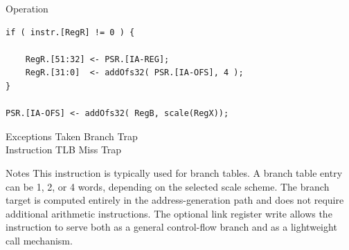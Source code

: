 \begin{iPageDescOpEntry}{Operation}
\begin{lstlisting}[style=iPageOpStyle]
if ( instr.[RegR] != 0 ) {
	
    RegR.[51:32] <- PSR.[IA-REG];
    RegR.[31:0]  <- addOfs32( PSR.[IA-OFS], 4 );
}

PSR.[IA-OFS] <- addOfs32( RegB, scale(RegX));
\end{lstlisting}
\end{iPageDescOpEntry}

\begin{iPageDescEntry}{Exceptions}
Taken Branch Trap\\
Instruction TLB Miss Trap
\end{iPageDescEntry}

\begin{iPageDescEntry}{Notes}
This instruction is typically used for branch tables. A branch table entry can be 1, 2, or 4 words, depending on the selected scale scheme. The branch target is computed entirely in the address-generation path and does not require additional arithmetic instructions. The optional link register write allows the instruction to serve both as a general control-flow branch and as a lightweight call mechanism.
\end{iPageDescEntry}

